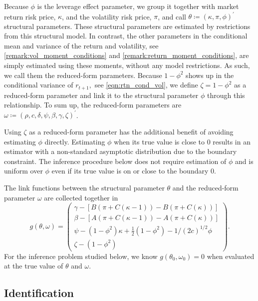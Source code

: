 Because $\phi$ is the leverage effect parameter, we group it together with market return risk price, $\kappa$, and the volatility risk price, $\pi$, and call $ \theta \coloneqq (\kappa ,\pi ,\phi )^{\prime}$ structural parameters. These structural parameters are estimated by restrictions from this structural model. In contrast, the other parameters in the conditional mean and variance of the return and volatility, see \cref{remark:vol_moment_conditions} and \cref{remark:return_moment_conditions}, are simply estimated using these moments, without any model restrictions. As such, we call them the reduced-form parameters. Because $1-\phi ^{2}$ shows up in the conditional variance of $r_{t+1},$ see \cref{eqn:rtn_cond_vol}, we define $\zeta =1-\phi ^{2}$ as a reduced-form parameter and link it to the structural parameter $\phi$ through this relationship. To sum up, the reduced-form parameters are $\omega \coloneqq (\rho, c,\delta, \psi, \beta, \gamma, \zeta )^{\prime }$.

Using $\zeta $ as a reduced-form parameter has the additional benefit of avoiding estimating $\phi$ directly. Estimating $\phi $ when its true value is close to 0 results in an estimator with a non-standard asymptotic distribution due to the boundary constraint. The inference procedure below does not require estimation of $\phi$ and is uniform over $\phi$ even if its true value is on or close to the boundary $0$.

The link functions between the structural parameter $\theta$ and the reduced-form parameter $\omega $ are collected together in
%
\begin{equation}
   g(\theta, \omega) = 
%
    \begin{pmatrix}
        \gamma - [B\left( \pi +C\left( \kappa -1\right) \right) -B\left( \pi +C\left( \kappa \right) \right)] \\ 
        \beta - [A\left( \pi +C\left( \kappa -1\right) \right) -A\left( \pi +C\left( \kappa \right) \right)] \\ 
        \psi -(1-\phi ^{2})\kappa +\frac{1}{2}(1-\phi ^{2})-1/(2c)^{1/2}\phi  \\ \zeta -\left( 1-\phi ^{2}\right) 
    \end{pmatrix}.
\end{equation}%
%
For the inference problem studied below, we know $g(\theta _{0},\omega_{0})=0$ when evaluated at the true value of $\theta $ and $\omega .$

\subsection{Identification}


